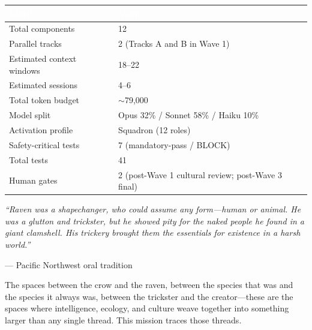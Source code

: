 \documentclass[11pt,letterpaper]{article}
\newcommand{\tableheader}[1]{\textbf{\sffamily\textcolor{white}{#1}}}
\begin{document}
\begin{center}
\begin{tabularx}{\textwidth}{L{5cm}X}
\toprule
{}
\tableheader{Metric} & \tableheader{Value} \\
\midrule
Total components & 12 \\
Parallel tracks & 2 (Tracks A and B in Wave 1) \\
Estimated context windows & 18--22 \\
Estimated sessions & 4--6 \\
Total token budget & $\sim$79,000 \\
Model split & Opus 32\% / Sonnet 58\% / Haiku 10\% \\
Activation profile & Squadron (12 roles) \\
Safety-critical tests & 7 (mandatory-pass / BLOCK) \\
Total tests & 41 \\
Human gates & 2 (post-Wave 1 cultural review; post-Wave 3 final) \\
\bottomrule
\end{tabularx}
\end{center}

\vspace{1em}

\begin{quotebox}
\textit{``Raven was a shapechanger, who could assume any form---human or animal. He was a glutton and trickster, but he showed pity for the naked people he found in a giant clamshell. His trickery brought them the essentials for existence in a harsh world.''}

\vspace{0.5em}

\hfill --- Pacific Northwest oral tradition

\vspace{1em}

The spaces between the crow and the raven, between the species that was and the species it always was, between the trickster and the creator---these are the spaces where intelligence, ecology, and culture weave together into something larger than any single thread. This mission traces those threads.
\end{quotebox}
\end{document}
